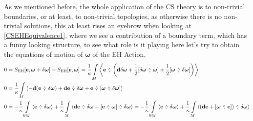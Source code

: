 As we mentioned before, the whole application of the CS theory is to non-trivial boundaries, or at least, to non-trivial 
topologies, as otherwise there is no non-trivial solutions, this at least rises an eyebrow when looking at \ref{CSEHEquivalence1}, where we see a 
contribution of a boundary term, which has a funny looking structure, to see what role is it playing here let's try to obtain the equations of motion 
of $\boldsymbol\omega$ of the EH Action,
\begin{align*}
    0&=S_{\textnormal{EH}}\qty[\vb e,\boldsymbol\omega+\delta\boldsymbol\omega]-S_{\textnormal{EH}}\qty[\vb e,\boldsymbol\omega]=\frac1\kappa\int\limits_M\expval{\vb e\ \wedgecomma\ \qty(\vb d\delta\boldsymbol\omega+\frac12\wedgecomm{\delta\boldsymbol\omega}{\boldsymbol\omega}+\frac12\wedgecomm{\boldsymbol\omega}{\delta\boldsymbol\omega})}\\
    0&=\frac1\kappa\int\limits_M\expval{-\vb d\qty(\vb e\ \wedgecomma\ \delta\boldsymbol\omega)+\vb d\vb e\ \wedgecomma\ \delta\boldsymbol\omega+\vb e\ \wedgecomma\ \wedgecomm{\boldsymbol\omega}{\delta\boldsymbol\omega}}\\
    0&=-\frac1\kappa\int\limits_{\partial M}\expval{\vb e\ \wedgecomma\ \delta\boldsymbol\omega}+\frac1\kappa\int\limits_M\expval{\vb d\vb e\ \wedgecomma\ {\delta\boldsymbol\omega}+\wedgecomm{\vb e}{\boldsymbol\omega}\ \wedgecomma\ {\delta\boldsymbol\omega}}=-\frac1\kappa\int\limits_{\partial M}\expval{\vb e\ \wedgecomma\ \delta\boldsymbol\omega}+\frac1\kappa\int\limits_M\expval{\qty(\vb d\vb e+\wedgecomm{\boldsymbol\omega}{\vb e})\ \wedgecomma\ {\delta\boldsymbol\omega}}
\end{align*}


